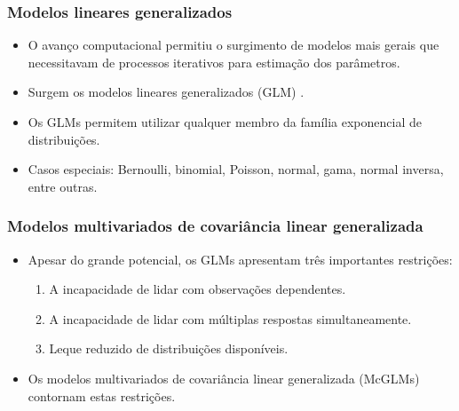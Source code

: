 \documentclass[10pt,
  aspectratio=169,
  serif,
  mathserif,
  professionalfont,
  compress,
  handout,
  ]{beamer}\usepackage[]{graphicx}\usepackage[]{color}
\begin{document}

\begin{frame}
  \frametitle{Modelos lineares generalizados}

  \begin{itemize}
    \itemsep 2ex

  \item O avanço computacional permitiu o surgimento de modelos mais gerais que necessitavam de processos iterativos para estimação dos parâmetros. 
  
  \item Surgem os modelos lineares generalizados (GLM) \cite{Nelder72}. 
  
  \item Os GLMs permitem utilizar qualquer membro da família exponencial de distribuições.

  \item Casos especiais: Bernoulli, binomial, Poisson, normal, gama, normal inversa, entre outras.
  
  \end{itemize}
\end{frame}


\begin{frame}
  \frametitle{Modelos multivariados de covariância linear generalizada}
  \begin{itemize}
    \itemsep 2ex
  
  \item Apesar do grande potencial, os GLMs apresentam três importantes restrições:
    \begin{enumerate}
      \itemsep 2ex
    
      \item A incapacidade de lidar com observações dependentes. 
      \item A incapacidade de lidar com múltiplas respostas simultaneamente.
      \item Leque reduzido de distribuições disponíveis. 
    \end{enumerate}

  \item Os modelos multivariados de covariância linear generalizada (McGLMs) \cite{Bonat16} contornam estas restrições.

  \end{itemize}
\end{frame}
\end{document}
